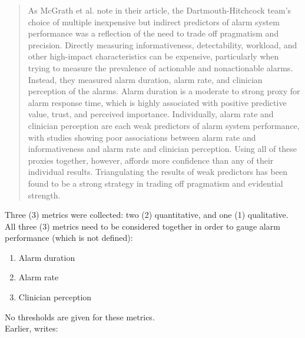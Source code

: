 \begin{quotation}
	As McGrath et al. note in their article, the Dartmouth-Hitchcock team’s choice of multiple inexpensive but indirect predictors of alarm system performance was a reflection of the need
	to trade off pragmatism and precision. Directly measuring informativeness, detectability, workload, and other high-impact
	characteristics can be expensive, particularly when trying to
	measure the prevalence of actionable and nonactionable alarms.
	Instead, they measured alarm duration, alarm rate, and clinician perception of the alarms. Alarm duration is a moderate
	to strong proxy for alarm response time, which is highly associated with positive predictive value, trust, and perceived importance. Individually, alarm rate and clinician perception are
	each weak predictors of alarm system performance, with studies showing poor associations between alarm rate and informativeness and alarm rate and clinician perception. Using all of
	these proxies together, however, affords more confidence than
	any of their individual results. Triangulating the results of weak
	predictors has been found to be a strong strategy in trading off
	pragmatism and evidential strength.
\end{quotation}

Three (3) metrics were collected: two (2) quantitative, and one (1) qualitative. All three (3) metrics need to be considered together in order to gauge alarm performance (which is not defined): \\

\begin{enumerate}
	\item Alarm duration
	\item Alarm rate
	\item Clinician perception
\end{enumerate}

No thresholds are given for these metrics. \\

Earlier, \citet[p.291]{rayo2016diagnosing} writes: \\

